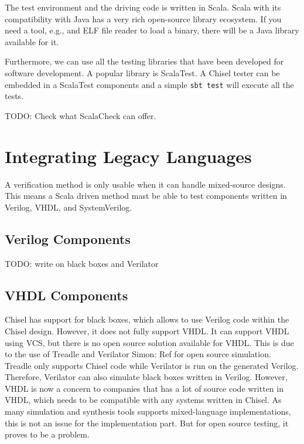 \documentclass[a4paper, conference]{IEEEtran}
\newcommand{\code}[1]{{\small{\texttt{#1}}}}
\newcommand{\todo}[1]{{\color{olive} TODO: #1}}
\newcommand{\simon}[1]{{\color{green} Simon: #1}}
\begin{document}
The test environment and the driving code is written in Scala. Scala with its
compatibility with Java has a very rich open-source library ecosystem.
If you need a tool, e.g., and ELF file reader to load a binary, there will be a Java
library available for it.

Furthermore, we can use all the testing libraries that have been developed for
software development. A popular library is ScalaTest. A Chisel tester can be embedded
in a ScalaTest components and a simple \code{sbt test} will execute all the tests.

\todo{Check what ScalaCheck can offer.}

\section{Integrating Legacy Languages}

A verification method is only usable when it can handle mixed-source designs.
This means a Scala driven method mast be able to test components written in Verilog,
VHDL, and SystemVerilog.

\subsection{Verilog Components}

\todo{write on black boxes and Verilator}

\subsection{VHDL Components}

Chisel has support for black boxes, which allows to use Verilog code within the Chisel design. However, it does not fully support VHDL. It can support VHDL using VCS, but there is no open source solution available for VHDL. This is due to the use of Treadle and Verilator \simon{Ref} for open source simulation. Treadle only supports Chisel code while Verilator is run on the generated Verilog. Therefore, Verilator can also simulate black boxes written in Verilog. However, VHDL is now a concern to companies that has a lot of source code written in VHDL, which needs to be compatible with any systems written in Chisel. As many simulation and synthesis tools supports mixed-language implementations, this is not an issue for the implementation part. But for open source testing, it proves to be a problem.
\end{document}
